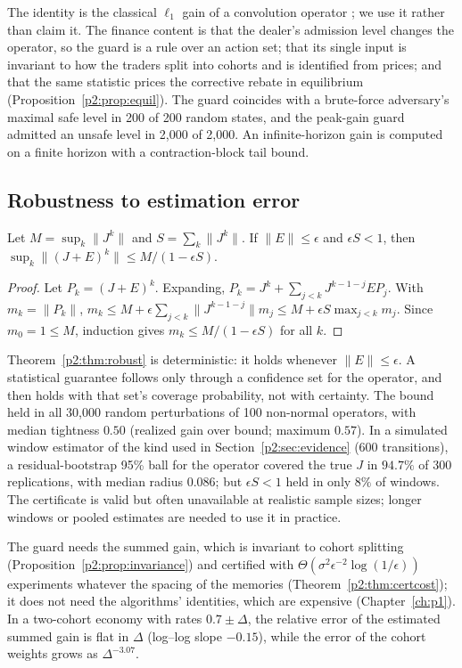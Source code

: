     The identity is the classical $\ell_1$ gain of a convolution operator \citep{p2:vidyasagar1986,p2:dahleh1987,p2:dahleh1995}; we use it rather than claim it. The finance content is that the dealer's admission level changes the operator, so the guard is a rule over an action set; that its single input is invariant to how the traders split into cohorts and is identified from prices; and that the same statistic prices the corrective rebate in equilibrium (Proposition~\ref{p2:prop:equil}). The guard coincides with a brute-force adversary's maximal safe level in 200 of 200 random states, and the peak-gain guard admitted an unsafe level in 2{,}000 of 2{,}000. An infinite-horizon gain is computed on a finite horizon with a contraction-block tail bound.

    \subsection{Robustness to estimation error}
\begin{theorem}\label{p2:thm:robust}
Let $M=\sup_k\|J^k\|$ and $S=\sum_k\|J^k\|$. If $\|E\|\le\epsilon$ and $\epsilon S<1$, then $\sup_k\|(J+E)^k\|\le M/(1-\epsilon S)$.
\end{theorem}

\begin{proof}
Let $P_k=(J+E)^k$. Expanding, $P_k=J^k+\sum_{j<k}J^{k-1-j}EP_j$. With $m_k=\|P_k\|$, $m_k\le M+\epsilon\sum_{j<k}\|J^{k-1-j}\|m_j\le M+\epsilon S\max_{j<k}m_j$. Since $m_0=1\le M$, induction gives $m_k\le M/(1-\epsilon S)$ for all $k$.
\end{proof}

Theorem~\ref{p2:thm:robust} is deterministic: it holds whenever $\|E\|\le\epsilon$. A statistical guarantee follows only through a confidence set for the operator, and then holds with that set's coverage probability, not with certainty. The bound held in all 30,000 random perturbations of 100 non-normal operators, with median tightness $0.50$ (realized gain over bound; maximum $0.57$). In a simulated window estimator of the kind used in Section~\ref{p2:sec:evidence} (600 transitions), a residual-bootstrap 95\% ball for the operator covered the true $J$ in $94.7\%$ of 300 replications, with median radius $0.086$; but $\epsilon S<1$ held in only $8\%$ of windows. The certificate is valid but often unavailable at realistic sample sizes; longer windows or pooled estimates are needed to use it in practice.

The guard needs the summed gain, which is invariant to cohort splitting (Proposition~\ref{p2:prop:invariance}) and certified with $\Theta(\sigma^2\epsilon^{-2}\log(1/\epsilon))$ experiments whatever the spacing of the memories (Theorem~\ref{p2:thm:certcost}); it does not need the algorithms' identities, which are expensive (Chapter~\ref{ch:p1}). In a two-cohort economy with rates $0.7\pm\Delta$, the relative error of the estimated summed gain is flat in $\Delta$ (log--log slope $-0.15$), while the error of the cohort weights grows as $\Delta^{-3.07}$.

